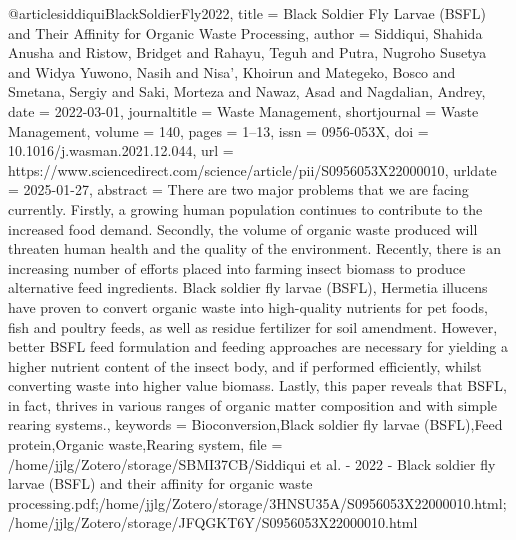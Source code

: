 {{{{@article{siddiquiBlackSoldierFly2022,
  title = {Black Soldier Fly Larvae ({{BSFL}}) and Their Affinity for Organic Waste Processing},
  author = {Siddiqui, Shahida Anusha and Ristow, Bridget and Rahayu, Teguh and Putra, Nugroho Susetya and Widya Yuwono, Nasih and Nisa', Khoirun and Mategeko, Bosco and Smetana, Sergiy and Saki, Morteza and Nawaz, Asad and Nagdalian, Andrey},
  date = {2022-03-01},
  journaltitle = {Waste Management},
  shortjournal = {Waste Management},
  volume = {140},
  pages = {1--13},
  issn = {0956-053X},
  doi = {10.1016/j.wasman.2021.12.044},
  url = {https://www.sciencedirect.com/science/article/pii/S0956053X22000010},
  urldate = {2025-01-27},
  abstract = {There are two major problems that we are facing currently. Firstly, a growing human population continues to contribute to the increased food demand. Secondly, the volume of organic waste produced will threaten human health and the quality of the environment. Recently, there is an increasing number of efforts placed into farming insect biomass to produce alternative feed ingredients. Black soldier fly larvae (BSFL), Hermetia illucens have proven to convert organic waste into high-quality nutrients for pet foods, fish and poultry feeds, as well as residue fertilizer for soil amendment. However, better BSFL feed formulation and feeding approaches are necessary for yielding a higher nutrient content of the insect body, and if performed efficiently, whilst converting waste into higher value biomass. Lastly, this paper reveals that BSFL, in fact, thrives in various ranges of organic matter composition and with simple rearing systems.},
  keywords = {Bioconversion,Black soldier fly larvae (BSFL),Feed protein,Organic waste,Rearing system},
  file = {/home/jjlg/Zotero/storage/SBMI37CB/Siddiqui et al. - 2022 - Black soldier fly larvae (BSFL) and their affinity for organic waste processing.pdf;/home/jjlg/Zotero/storage/3HNSU35A/S0956053X22000010.html;/home/jjlg/Zotero/storage/JFQGKT6Y/S0956053X22000010.html}
}

}}}}
